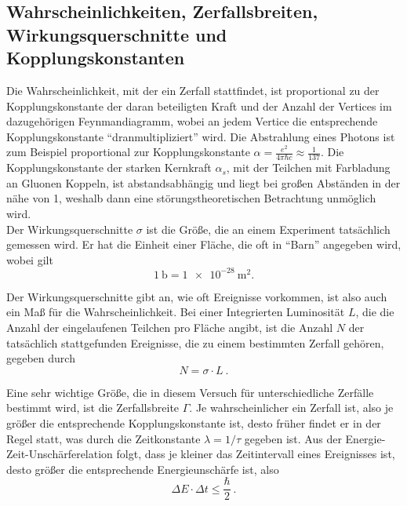 \documentclass[a4paper,ngerman]{scrartcl}
\begin{document}
\subsection{Wahrscheinlichkeiten, Zerfallsbreiten, Wirkungsquerschnitte und Kopplungskonstanten}
\label{sec:zerfallsbreiten}
Die Wahrscheinlichkeit, mit der ein Zerfall stattfindet, 
ist proportional zu der Kopplungskonstante der daran beteiligten Kraft und der Anzahl der Vertices im
dazugehörigen Feynmandiagramm, wobei an jedem Vertice die entsprechende Kopplungskonstante "`dranmultipliziert"' wird.
Die Abstrahlung eines Photons ist zum Beispiel proportional zur Kopplungskonstante $\alpha = \frac{e^2}{4 \pi\hbar c} \approx \frac{1}{137}$.
Die Kopplungskonstante der starken Kernkraft $\alpha_s$, mit der Teilchen mit Farbladung an Gluonen Koppeln, ist abstandsabhängig und liegt bei großen Abständen in der nähe von 1, weshalb dann eine störungstheoretischen Betrachtung unmöglich wird.\\

Der Wirkungsquerschnitte $\sigma$ ist die Größe, die an einem Experiment tatsächlich gemessen wird.
Er hat die Einheit einer Fläche, die oft in "`Barn"' angegeben wird, wobei gilt
\begin{equation}
  \SI{1}{\barn} = \SI{1e-28}{\meter\squared}.
\end{equation}

Der Wirkungsquerschnitte gibt an, wie oft Ereignisse vorkommen, ist also auch ein Maß für die Wahrscheinlichkeit.
Bei einer Integrierten Luminosität $L$, die die Anzahl der eingelaufenen Teilchen pro Fläche angibt,
ist die Anzahl $N$ der tatsächlich stattgefunden Ereignisse, die zu einem bestimmten Zerfall gehören, gegeben durch
\begin{equation}
  N = \sigma \cdot L~.
\end{equation}

Eine sehr wichtige Größe, die in diesem Versuch für unterschiedliche Zerfälle bestimmt wird, ist die Zerfallsbreite $\Gamma$.
Je wahrscheinlicher ein Zerfall ist, also je größer die entsprechende Kopplungskonstante ist, 
desto früher findet er in der Regel statt, was durch die Zeitkonstante $\lambda = 1/\tau$ gegeben ist.
Aus der Energie-Zeit-Unschärferelation folgt, dass je kleiner das Zeitintervall eines Ereignisses ist,
desto größer die entsprechende Energieunschärfe ist, also
\begin{equation}
  \Delta E \cdot \Delta t \leq \frac{\hbar}{2}~.
\end{equation}
\end{document}
